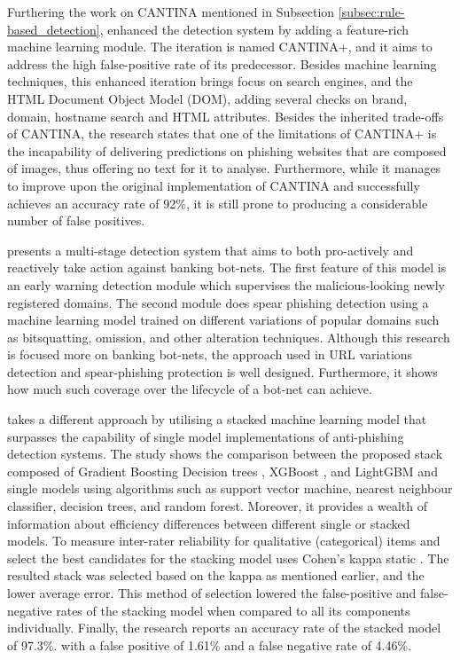 Furthering the work on CANTINA mentioned in Subsection \ref{subsec:rule-based_detection}, \cite{Guang_Xiang} enhanced the detection system by adding a feature-rich machine learning module. The iteration is named CANTINA+, and it aims to address the high false-positive rate of its predecessor. Besides machine learning techniques, this enhanced iteration brings focus on search engines, and the HTML Document Object Model (DOM), adding several checks on brand, domain, hostname search and HTML attributes. Besides the inherited trade-offs of CANTINA, the research states that one of the limitations of CANTINA+ is the incapability of delivering predictions on phishing websites that are composed of images, thus offering no text for it to analyse. Furthermore, while it manages to improve upon the original implementation of CANTINA and successfully achieves an accuracy rate of 92\%, it is still prone to producing a considerable number of false positives.

\cite{Ling_Li} presents a multi-stage detection system that aims to both pro-actively and reactively take action against banking bot-nets. The first feature of this model is an early warning detection module which supervises the malicious-looking newly registered domains. The second module does spear phishing detection using a machine learning model trained on different variations of popular domains such as bitsquatting, omission, and other alteration techniques. Although this research is focused more on banking bot-nets, the approach used in URL variations detection and spear-phishing protection is well designed. Furthermore, it shows how much such coverage over the lifecycle of a bot-net can achieve.

\cite{Li_Yukun} takes a different approach by utilising a stacked machine learning model that surpasses the capability of single model implementations of anti-phishing detection systems. The study shows the comparison between the proposed stack composed of Gradient Boosting Decision trees \citep{Jerome_Friedman}, XGBoost \citep{Tianqi_Chen}, and LightGBM \citep{Guolin_Ke} and single models using algorithms such as support vector machine, nearest neighbour classifier, decision trees, and random forest. Moreover, it provides a wealth of information about efficiency differences between different single or stacked models. To measure inter-rater reliability for qualitative (categorical) items and select the best candidates for the stacking model \cite{Li_Yukun} uses Cohen's kappa static \citep{Ian_Witten}. The resulted stack was selected based on the kappa as mentioned earlier, and the lower average error.
This method of selection lowered the false-positive and false-negative rates of the stacking model when compared to all its components individually. Finally, the research reports an accuracy rate of the stacked
model of 97.3\%. with a false positive of 1.61\% and a false negative rate of
4.46\%.

